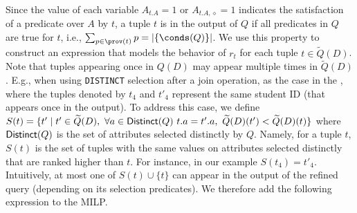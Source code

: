 Since the value of each variable $A_{t.A} = 1$ or $A_{t.A, \diamond} = 1$ indicates the satisfaction of a predicate over $A$ by $t$, a tuple $t$ is in the output of $Q$ if all predicates in $Q$ are true for $t$, i.e., $\sum_{p \in \prov(t)} p = |\{\conds(Q)\}|$. We use this property to construct an expression that models the behavior of $r_t$ for each tuple $t\in\widetilde{Q}(D)$.
Note that tuples appearing once in $Q(D)$ may appear multiple times in  $\widetilde{Q}(D)$. E.g., when using {\tt DISTINCT} selection after a join operation, as the case in the \running{}, where the tuples denoted by $t_4$ and $t'_4$ represent the same student ID (that appears once in the output). To address this case, we define $S(t) = \{ t' \mid t' \in \widetilde{Q}(D),\ \forall a \in {\sf Distinct}(Q)\ t.a = t'.a,\ \widetilde{Q}(D)(t') < \widetilde{Q}(D)(t) \}$ where ${\sf Distinct}(Q)$ is the set of attributes selected distinctly by $Q$. Namely, for a tuple $t$, $S(t)$ is the set of tuples with the same values on attributes selected distinctly that are ranked higher than $t$. For instance, in our example $S(t_4) = t'_4$. Intuitively, at most one of $S(t)\cup\{t\}$ can appear in the output of the refined query (depending on its selection predicates). We therefore add the following expression to the MILP. 


